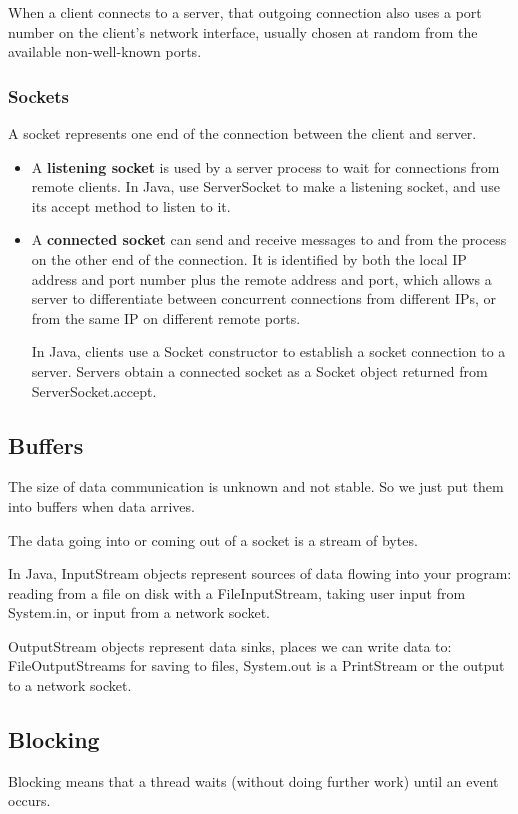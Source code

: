 \documentclass[letterpaper,12pt]{article}
\begin{document}
When a client connects to a server, that outgoing connection also uses a port number on the client's network interface, usually chosen at random from the available non-well-known ports.

\subsubsection{Sockets}
A socket represents one end of the connection between the client and server.
\begin{itemize}
      \item A \textbf{listening socket} is used by a server process to wait for connections from remote clients. In Java, use ServerSocket to make a listening socket, and use its accept method to listen to it.
      \item A \textbf{connected socket} can send and receive messages to and from the process on the other end of the connection. It is identified by both the local IP address and port number plus the remote address and port, which allows a server to differentiate between concurrent connections from different IPs, or from the same IP on different remote ports.

            In Java, clients use a Socket constructor to establish a socket connection to a server. Servers obtain a connected socket as a Socket object returned from ServerSocket.accept.
\end{itemize}

\subsection{Buffers}
The size of data communication is unknown and not stable. So we just put them into buffers when data arrives. 

The data going into or coming out of a socket is a stream of bytes.

In Java, InputStream objects represent sources of data flowing into your program: reading from a file on disk with a FileInputStream, taking user input from System.in, or input from a network socket.

OutputStream objects represent data sinks, places we can write data to: FileOutputStreams for saving to files, System.out is a PrintStream or the output to a network socket.

\subsection{Blocking}
Blocking means that a thread waits (without doing further work) until an event occurs.
\end{document}
